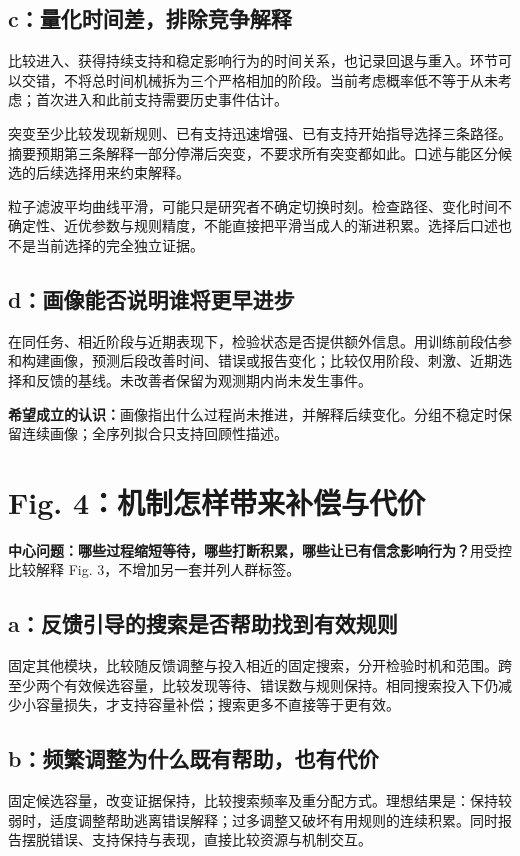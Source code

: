 \documentclass[12pt]{article}
\begin{document}
\subsection{c：量化时间差，排除竞争解释}
比较进入、获得持续支持和稳定影响行为的时间关系，也记录回退与重入。环节可以交错，不将总时间机械拆为三个严格相加的阶段。当前考虑概率低不等于从未考虑；首次进入和此前支持需要历史事件估计。

突变至少比较发现新规则、已有支持迅速增强、已有支持开始指导选择三条路径。摘要预期第三条解释一部分停滞后突变，不要求所有突变都如此。口述与能区分候选的后续选择用来约束解释。

粒子滤波平均曲线平滑，可能只是研究者不确定切换时刻。检查路径、变化时间不确定性、近优参数与规则精度，不能直接把平滑当成人的渐进积累。选择后口述也不是当前选择的完全独立证据。

\subsection{d：画像能否说明谁将更早进步}
在同任务、相近阶段与近期表现下，检验状态是否提供额外信息。用训练前段估参和构建画像，预测后段改善时间、错误或报告变化；比较仅用阶段、刺激、近期选择和反馈的基线。未改善者保留为观测期内尚未发生事件。

\textbf{希望成立的认识：}画像指出什么过程尚未推进，并解释后续变化。分组不稳定时保留连续画像；全序列拟合只支持回顾性描述。

\section{Fig. 4：机制怎样带来补偿与代价}
\textbf{中心问题：哪些过程缩短等待，哪些打断积累，哪些让已有信念影响行为？}用受控比较解释 Fig. 3，不增加另一套并列人群标签。

\subsection{a：反馈引导的搜索是否帮助找到有效规则}
固定其他模块，比较随反馈调整与投入相近的固定搜索，分开检验时机和范围。跨至少两个有效候选容量，比较发现等待、错误数与规则保持。相同搜索投入下仍减少小容量损失，才支持容量补偿；搜索更多不直接等于更有效。

\subsection{b：频繁调整为什么既有帮助，也有代价}
固定候选容量，改变证据保持，比较搜索频率及重分配方式。理想结果是：保持较弱时，适度调整帮助逃离错误解释；过多调整又破坏有用规则的连续积累。同时报告摆脱错误、支持保持与表现，直接比较资源与机制交互。
\end{document}
